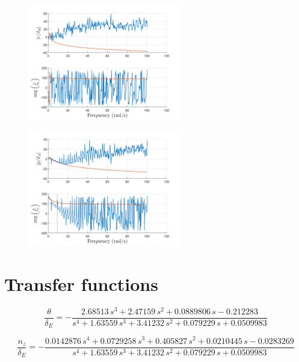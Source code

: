 \documentclass{article}
\begin{document}
  \begin{figure}[H]
      \centering
      \includegraphics[width=0.6\textwidth]{rudder_to_yawrate.png}
      \caption{}
      \label{fig:rudder_to_yawrate}
  \end{figure}
  
  \begin{figure}[H]
      \centering
      \includegraphics[width=0.6\textwidth]{aileron_to_rollrate.png}
      \caption{}
      \label{fig:aileron_to_rollrate}
  \end{figure}

\section{Transfer functions}

\begin{equation}
    \frac{\theta}{\delta_E} =
    -\frac{2.68513\,s^3+2.47159\,s^2+0.0889806\,s-0.212283}{s^4+1.63559\,s^3+3.41232\,s^2+0.079229\,s+0.0509983}
\end{equation}

\begin{equation}
    \frac{n_z}{\delta_E} =
    -\frac{0.0142876\,s^4+0.0729258\,s^3+0.405827\,s^2+0.0210445\,s-0.0283269}{s^4+1.63559\,s^3+3.41232\,s^2+0.079229\,s+0.0509983}
\end{equation}
\end{document}
